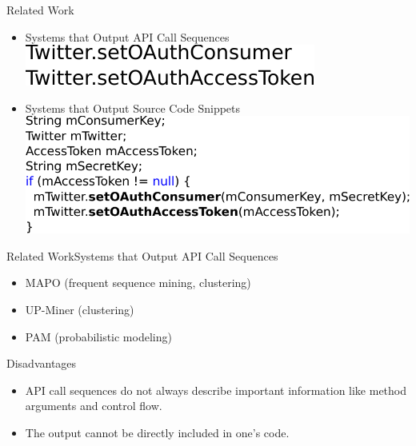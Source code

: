 \documentclass[11pt]{beamer}
\begin{document}
\begin{frame}{Related Work}{}
	\begin{itemize}
		\item {
			Systems that Output API Call Sequences\\
			\vspace{5pt}
			\includegraphics[scale=0.5]{SequenceOutput}
		}
		\item {
			Systems that Output Source Code Snippets\\
			\vspace{5pt}
			\includegraphics[scale=0.5]{SnippetOutput}
		}
	\end{itemize}
\end{frame}

\begin{frame}{Related Work}{Systems that Output API Call Sequences}
	\begin{itemize}
		\item {
			MAPO (frequent sequence mining, clustering)
		}
		\item {UP-Miner (clustering)
		}
		\item {PAM (probabilistic modeling)
		}
	\end{itemize}
	  
	\begin{alertblock}{Disadvantages}
		\begin{itemize}
			\item {
				API call sequences do not always describe important information like method arguments and control flow.
			}
			\item {The output cannot be directly included in one's code.
			}
		\end{itemize}
	\end{alertblock}
\end{frame}
\end{document}
